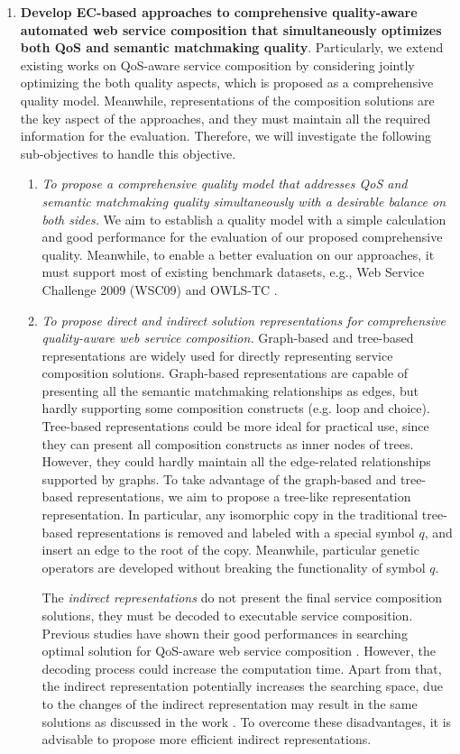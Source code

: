 \begin{enumerate}
  \item \label{Obj:1} \textbf{Develop EC-based approaches to comprehensive quality-aware automated web service composition that simultaneously optimizes both QoS and semantic matchmaking quality}. Particularly, we extend existing works on QoS-aware service composition by considering jointly optimizing the both quality aspects, which is proposed as a comprehensive quality model. Meanwhile, representations of the composition solutions are the key aspect of the approaches, and they must maintain all the required information for the evaluation. Therefore, we will investigate the following sub-objectives to handle this objective.
  \begin{enumerate}
    \item \emph{To propose a comprehensive quality model that addresses QoS and semantic matchmaking quality simultaneously with a desirable balance on both sides.} We aim to establish a quality model with a simple calculation and good performance for the evaluation of our proposed comprehensive quality. Meanwhile, to enable a better evaluation on our approaches, it must support most of existing benchmark datasets, e.g., Web Service Challenge 2009 (WSC09)\cite{kona2009wsc} and OWLS-TC \cite{kuster2008opossum}.
    
    \item \emph{To propose direct and indirect solution representations for comprehensive quality-aware web service composition.} Graph-based and tree-based representations are widely used for directly representing service composition solutions. Graph-based representations are capable of presenting all the semantic matchmaking relationships as edges, but hardly supporting some composition constructs (e.g. loop and choice). Tree-based representations could be more ideal for practical use, since they can present all composition constructs as inner nodes of trees. However, they could hardly maintain all the edge-related relationships supported by graphs. To take advantage of the graph-based and tree-based representations, we aim to propose a tree-like representation representation. In particular, any isomorphic copy in the traditional tree-based representations is removed and labeled with a special symbol $q$, and insert an edge to the root of the copy. Meanwhile, particular genetic operators are developed without breaking the functionality of symbol $q$.
    
    The \emph{indirect representations} do not present the final service composition solutions, they must be decoded to executable service composition. Previous studies have shown their good performances in searching optimal solution for QoS-aware web service composition \cite{da2016memetic,da2016particle}. However, the decoding process could increase the computation time. Apart from that, the indirect representation potentially increases the searching space, due to the changes of the indirect representation may result in the same solutions as discussed in the work \cite{da2016particle}. To overcome these disadvantages, it is advisable to propose more efficient indirect representations.
    

\end{enumerate}
\end{enumerate}
